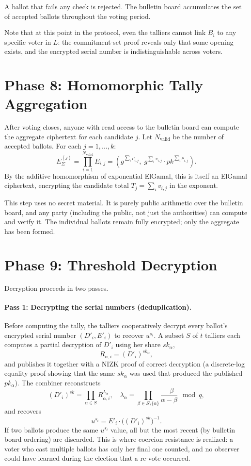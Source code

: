 \documentclass[12pt,a4paper,oneside]{report}
\begin{document}
A ballot that fails any check is rejected. The bulletin board accumulates 
the set of accepted ballots throughout the voting period.

Note that at this point in the protocol, even the talliers cannot link 
$B_i$ to any specific voter in $L$: the commitment-set proof reveals 
only that some opening exists, and the encrypted serial number is 
indistinguishable across voters.

\section{Phase 8: Homomorphic Tally Aggregation}
\label{sec:phase-8-aggregation}

After voting closes, anyone with read access to the bulletin board can 
compute the aggregate ciphertext for each candidate $j$. Let 
$N_{\text{valid}}$ be the number of accepted ballots. For each 
$j = 1, \ldots, k$:
\[
    E_\Sigma^{(j)} = \prod_{i=1}^{N_{\text{valid}}} E_{i, j} 
    = \left( g^{\sum_i \rho_{i, j}},\; g^{\sum_i v_{i, j}} \cdot pk^{\sum_i \rho_{i, j}} \right).
\]
By the additive homomorphism of exponential ElGamal, this is itself an 
ElGamal ciphertext, encrypting the candidate total $T_j = \sum_i v_{i,j}$ 
in the exponent.

This step uses no secret material. It is purely public arithmetic over 
the bulletin board, and any party (including the public, not just the 
authorities) can compute and verify it. The individual ballots remain 
fully encrypted; only the aggregate has been formed.

\section{Phase 9: Threshold Decryption}
\label{sec:phase-9-decryption}

Decryption proceeds in two passes.

\paragraph{Pass 1: Decrypting the serial numbers (deduplication).}
Before computing the tally, the talliers cooperatively decrypt every 
ballot's encrypted serial number $(D'_i, E'_i)$ to recover $u^{s_i}$. 
A subset $S$ of $t$ talliers each computes a partial decryption of 
$D'_i$ using her share $sk_\alpha$,
\[
    R_{\alpha, i} = (D'_i)^{sk_\alpha},
\]
and publishes it together with a NIZK proof of correct decryption (a 
discrete-log equality proof showing that the same $sk_\alpha$ was used 
that produced the published $pk_\alpha$). The combiner reconstructs
\[
    (D'_i)^{sk} = \prod_{\alpha \in S} R_{\alpha, i}^{\lambda_\alpha}, \quad
    \lambda_\alpha = \prod_{\beta \in S \setminus \{\alpha\}} \frac{-\beta}{\alpha - \beta} \mod q,
\]
and recovers
\[
    u^{s_i} = E'_i \cdot \big((D'_i)^{sk}\big)^{-1}.
\]
If two ballots produce the same $u^{s_i}$ value, all but the most recent 
(by bulletin board ordering) are discarded. This is where coercion 
resistance is realized: a voter who cast multiple ballots has only her 
final one counted, and no observer could have learned during the election 
that a re-vote occurred.
\end{document}
